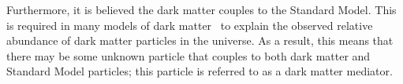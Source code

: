 %

Furthermore, it is believed the dark matter couples to the Standard Model.
This is required in many models of dark matter~\cite{theo-bsm_dm_feng} to explain the
observed relative abundance of dark matter particles in the universe.
As a result, this means that there may be some unknown particle that couples to both dark matter and
Standard Model particles; this particle is referred to as a dark matter mediator.

